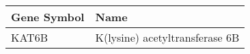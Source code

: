\begin{tabular}{ll}
\toprule
Gene Symbol &                           Name \\
\midrule
      KAT6B & K(lysine) acetyltransferase 6B \\
\bottomrule
\end{tabular}
